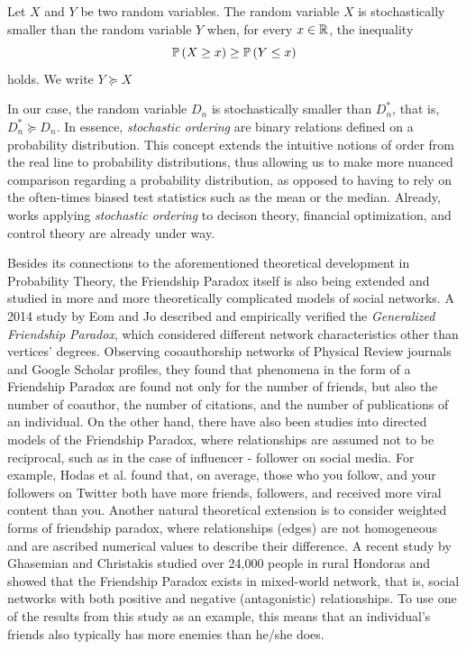 \documentclass[12pt,reqno, a4]{amsart}
\begin{document}
\begin{definition}
    Let $X$ and $Y$ be two random variables. The random variable $X$ is stochastically smaller than the random variable $Y$ when, for every $x \in \mathbb{R}$, the inequality
    \[
    \mathbb{P}\left (X \geq x \right) \geq \mathbb{P}\left (Y \leq x \right)
    \] holds. We write $Y \succeq X$
\end{definition}
\noindent In our case, the random variable $D_n$ is stochastically smaller than $D_n^*$, that is, $D_n^* \succeq D_n$. In essence, \textit{stochastic ordering} are binary relations defined on a probability distribution. This concept extends the intuitive notions of order from the real line to probability distributions, thus allowing us to make more nuanced comparison regarding a probability distribution, as opposed to having to rely on the often-times biased test statistics such as the mean or the median. Already, works applying \textit{stochastic ordering} to decison theory, financial optimization, and control theory are already under way.

Besides its connections to the aforementioned theoretical development in Probability Theory, the Friendship Paradox itself is also being extended and studied in more and more theoretically complicated models of social networks. A 2014 study by Eom and Jo \cite{eom_generalized_2014} described and empirically verified the \textit{Generalized Friendship Paradox}, which considered different network characteristics other than vertices' degrees. Observing cooauthorship networks of Physical Review journals and Google Scholar profiles, they found that phenomena in the form of a Friendship Paradox are found not only for the number of friends, but also the number of coauthor, the number of citations, and the number of publications of an individual. On the other hand, there have also been studies into directed models of the Friendship Paradox, where relationships are assumed not to be reciprocal, such as in the case of influencer - follower on social media. For example, Hodas et al. \cite{hodas_friendship_2013} found that, on average, those who you follow, and your followers on Twitter both have more friends, followers, and received more viral content than you. Another natural theoretical extension is to consider weighted forms of friendship paradox, where relationships (edges) are not homogeneous and are ascribed numerical values to describe their difference. A recent study by Ghasemian and Christakis \cite{ghasemian_enmity_2023} studied over 24,000 people in rural Hondoras and showed that the Friendship Paradox exists in mixed-world network, that is, social networks with both positive and negative (antagonistic) relationships. To use one of the results from this study as an example, this means that an individual's friends also typically has more enemies than he/she does.
\end{document}
